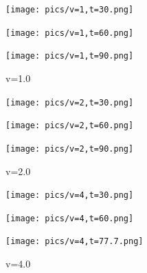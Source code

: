 \documentclass{article}
\begin{document}
	\begin{figure}[htbp]
		\begin{minipage}{0.33\textwidth}
			\texttt{[image: pics/v=1,t=30.png]}
		\end{minipage}
		\begin{minipage}{0.33\textwidth}
			\texttt{[image: pics/v=1,t=60.png]}
		\end{minipage}
		\begin{minipage}{0.33\textwidth}
			\texttt{[image: pics/v=1,t=90.png]}
		\end{minipage}
		\caption{v=1.0}
		\label{fig16}
	\end{figure}
	
	\begin{figure}[htbp]
		\begin{minipage}{0.33\textwidth}
			\texttt{[image: pics/v=2,t=30.png]}
		\end{minipage}
		\begin{minipage}{0.33\textwidth}
			\texttt{[image: pics/v=2,t=60.png]}
		\end{minipage}
		\begin{minipage}{0.33\textwidth}
			\texttt{[image: pics/v=2,t=90.png]}
		\end{minipage}
		\caption{v=2.0}
		\label{fig17}
	\end{figure}

	\begin{figure}[htbp]
		\begin{minipage}{0.33\textwidth}
			\texttt{[image: pics/v=4,t=30.png]}
		\end{minipage}
		\begin{minipage}{0.33\textwidth}
			\texttt{[image: pics/v=4,t=60.png]}
		\end{minipage}
		\begin{minipage}{0.33\textwidth}
			\texttt{[image: pics/v=4,t=77.7.png]}
		\end{minipage}
		\caption{v=4.0}
		\label{fig18}
	\end{figure}
    \clearpage
\end{document}
